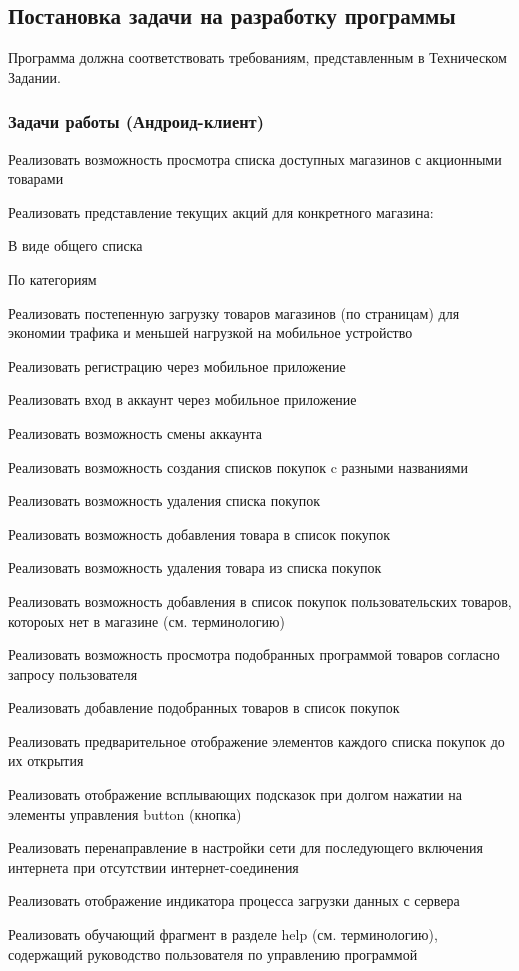 \subsection{Постановка задачи на разработку программы}
\tab[0.75cm]Программа должна соответствовать требованиям, представленным в
Техническом
Задании.

\bigskip
\subsubsection{Задачи работы (Андроид-клиент)}
\smallskip
\begin{my_enumerate}
\item Реализовать возможность просмотра списка доступных магазинов с акционными товарами
\item Реализовать представление текущих акций для конкретного магазина:
    \begin{my_enumerate}
    \item В виде общего списка
    \item По категориям
    \end{my_enumerate}
\item Реализовать постепенную загрузку товаров магазинов (по страницам) для экономии трафика и меньшей нагрузкой на мобильное устройство
\item Реализовать регистрацию через мобильное приложение
\item Реализовать вход в аккаунт через мобильное приложение
\item Реализовать возможность смены аккаунта
\item Реализовать возможность создания списков покупок c разными названиями
\item Реализовать возможность удаления списка покупок
\item Реализовать возможность добавления товара в список покупок
\item Реализовать возможность удаления товара из списка покупок
\item Реализовать возможность добавления в список покупок пользовательских товаров, котороых нет в магазине (см. терминологию)
\item Реализовать возможность просмотра подобранных программой товаров согласно запросу пользователя
\item Реализовать добавление подобранных товаров в список покупок
\item Реализовать предварительное отображение элементов каждого списка покупок до их открытия
\item Реализовать отображение всплывающих подсказок при долгом нажатии на элементы управления button (кнопка)
\item Реализовать перенаправление в настройки сети для последующего включения интернета при отсутствии интернет-соединения
\item Реализовать отображение индикатора процесса загрузки данных с сервера
\item Реализовать обучающий фрагмент в разделе help (см. терминологию), содержащий руководство пользователя по управлению программой
\end{my_enumerate}

